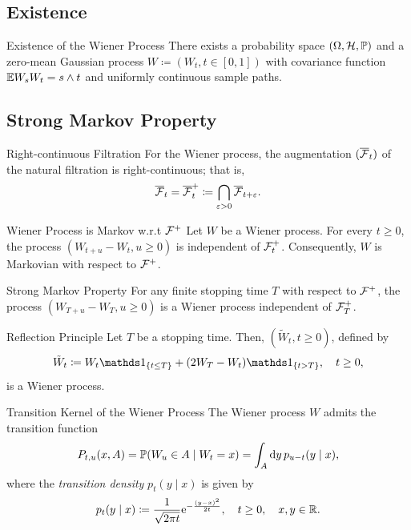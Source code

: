 \subsection{Existence}

\begin{thm}{Existence of the Wiener Process}{}
	There exists a probability space $(\Omega, \mathcal{H}, \mathbb{P})$ and a zero-mean Gaussian process $W \coloneqq (W_t, t \in [0, 1])$ with covariance function $\mathbb{E} W_s W_t = s \wedge t$ and uniformly continuous sample paths.
\end{thm}

\subsection{Strong Markov Property}


\begin{thm}{Right-continuous Filtration}{}
	For the Wiener process, the augmentation $(\overline{\mathcal{F}}_t)$ of the natural filtration is right-continuous; that is,
	\begin{equation*}
		\overline{\mathcal{F}}_t = \overline{\mathcal{F}}_t^+ \coloneqq \bigcap_{\varepsilon > 0} \overline{\mathcal{F}}_{t+\varepsilon}.
	\end{equation*}
\end{thm}

\begin{thm}{Wiener Process is Markov w.r.t $\mathcal{F}^+$}{}
	Let $W$ be a Wiener process. For every $t \ge 0$, the process $(W_{t+u} - W_t, u \ge 0)$ is independent of $\mathcal{F}_t^+$. Consequently, $W$ is Markovian with respect to $\mathcal{F}^+$.
\end{thm}

\begin{thm}{Strong Markov Property}{}
	For any finite stopping time $T$ with respect to $\mathcal{F}^+$, the process $(W_{T+u} - W_T, u \ge 0)$ is a Wiener process independent of $\mathcal{F}_T^+$.
\end{thm}

\begin{thm}{Reflection Principle}{}
	Let $T$ be a stopping time. Then, $(\tilde{W}_t, t \ge 0)$, defined by
	\begin{equation}
		\tilde{W}_t \coloneqq W_t \I_{\{t \le T\}} + (2W_T - W_t) \I_{\{t > T\}}, \quad t \ge 0,
		\label{eq:ReflectionProcess}
	\end{equation}
	is a Wiener process.
\end{thm}

\begin{thm}{Transition Kernel of the Wiener Process}{}
	The Wiener process $W$ admits the transition function
	\begin{equation*}
		P_{t,u}(x, A) = \mathbb{P}(W_u \in A \mid W_t = x) = \int_A \mathrm{d} y \, p_{u-t}(y \mid x),
	\end{equation*}
	where the \textit{transition density} $p_t(y \mid x)$ is given by
	\begin{equation}
		p_t(y \mid x) \coloneqq \frac{1}{\sqrt{2 \pi t}} \mathrm{e}^{-\frac{(y-x)^2}{2t}}, \quad t \ge 0, \quad x,y \in \mathbb{R}.
		\label{eq:WienerTransitionDensity}
	\end{equation}
\end{thm}

